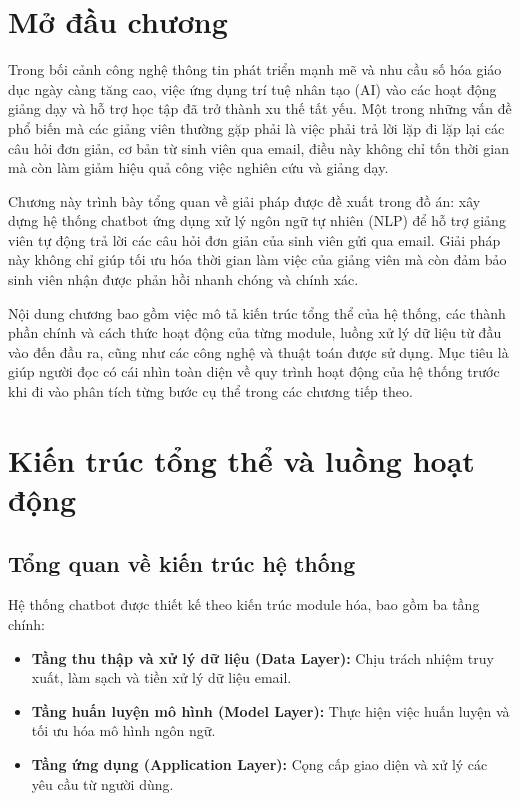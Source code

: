 \documentclass[../DoAn.tex]{subfiles}
\begin{document}
\section{Mở đầu chương}
Trong bối cảnh công nghệ thông tin phát triển mạnh mẽ và nhu cầu số hóa giáo dục ngày càng tăng cao, việc ứng dụng trí tuệ nhân tạo (AI) vào các hoạt động giảng dạy và hỗ trợ học tập đã trở thành xu thế tất yếu. Một trong những vấn đề phổ biến mà các giảng viên thường gặp phải là việc phải trả lời lặp đi lặp lại các câu hỏi đơn giản, cơ bản từ sinh viên qua email, điều này không chỉ tốn thời gian mà còn làm giảm hiệu quả công việc nghiên cứu và giảng dạy.

Chương này trình bày tổng quan về giải pháp được đề xuất trong đồ án: xây dựng hệ thống chatbot ứng dụng xử lý ngôn ngữ tự nhiên (NLP) để hỗ trợ giảng viên tự động trả lời các câu hỏi đơn giản của sinh viên gửi qua email. Giải pháp này không chỉ giúp tối ưu hóa thời gian làm việc của giảng viên mà còn đảm bảo sinh viên nhận được phản hồi nhanh chóng và chính xác.

Nội dung chương bao gồm việc mô tả kiến trúc tổng thể của hệ thống, các thành phần chính và cách thức hoạt động của từng module, luồng xử lý dữ liệu từ đầu vào đến đầu ra, cũng như các công nghệ và thuật toán được sử dụng. Mục tiêu là giúp người đọc có cái nhìn toàn diện về quy trình hoạt động của hệ thống trước khi đi vào phân tích từng bước cụ thể trong các chương tiếp theo.

\section{Kiến trúc tổng thể và luồng hoạt động}

\subsection{Tổng quan về kiến trúc hệ thống}
Hệ thống chatbot được thiết kế theo kiến trúc module hóa, bao gồm ba tầng chính:
\begin{itemize}
    \item \textbf{Tầng thu thập và xử lý dữ liệu (Data Layer):} Chịu trách nhiệm truy xuất, làm sạch và tiền xử lý dữ liệu email.
    \item \textbf{Tầng huấn luyện mô hình (Model Layer):} Thực hiện việc huấn luyện và tối ưu hóa mô hình ngôn ngữ.
    \item \textbf{Tầng ứng dụng (Application Layer):} Cǫng cấp giao diện và xử lý các yêu cầu từ người dùng.
\end{itemize}
\end{document}
